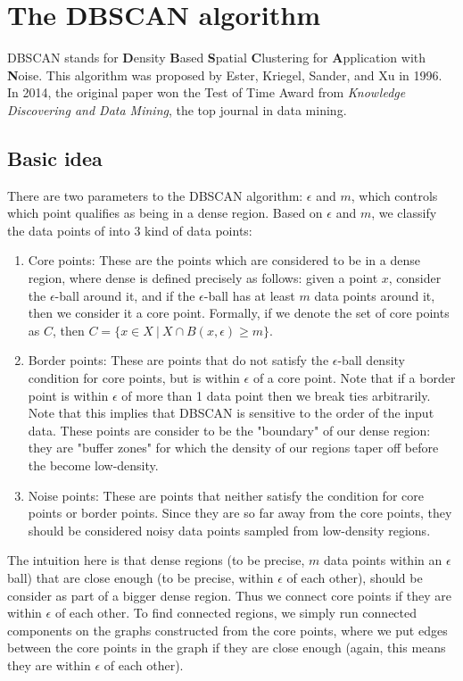 \section{The DBSCAN algorithm}
  DBSCAN stands for \textbf{D}ensity \textbf{B}ased \textbf{S}patial
  \textbf{C}lustering  for \textbf{A}pplication with \textbf{N}oise. This
  algorithm was proposed by Ester, Kriegel, Sander, and Xu in 1996. In 2014,
  the original paper won the Test of Time Award from \textit{Knowledge Discovering and Data Mining},
  the top journal in data mining.
  \subsection{Basic idea}
  There are two parameters to the DBSCAN algorithm: $\epsilon$ and $m$, which
  controls which point qualifies as being in a dense region. Based on $\epsilon$
  and $m$, we classify the data points of into 3 kind of data points:

  \begin{enumerate}
  \item Core points: These are the points which are considered to be in a
  dense region, where dense is defined precisely as follows: given a point $x$,
  consider the $\epsilon$-ball around it, and if the $\epsilon$-ball has
  at least $m$ data points around it, then we consider it a core point. Formally,
  if we denote the set of core points as $C$, then $C=\{x \in X \ | \ X \cap B(x,\epsilon)\geq m\}$.
  \item Border points: These are points that do not satisfy the $\epsilon$-ball
  density condition for core points, but is within $\epsilon$ of a core point.
  Note that if a border point is within $\epsilon$ of more than 1 data point
  then we break ties arbitrarily. Note that this implies that DBSCAN is sensitive
  to the order of the input data. These points are consider to be the "boundary"
  of our dense region: they are "buffer zones" for which the density of our regions
  taper off before the become low-density.
  \item Noise points: These are points that neither satisfy the condition for
  core points or border points. Since they are so far away from the core points,
  they should be considered noisy data points sampled from low-density regions.
  \end{enumerate}

  The intuition here is that dense regions (to be precise, $m$ data points within
  an $\epsilon$ ball) that are close enough (to be precise, within $\epsilon$ of each other),
  should be consider as part of a bigger dense region. Thus we connect core
  points if they are within $\epsilon$ of each other. To find connected regions,
  we simply run connected components on the graphs constructed from the core
  points, where we put edges between the core points in the graph if they are
  close enough (again, this means they are within $\epsilon$ of each other).

